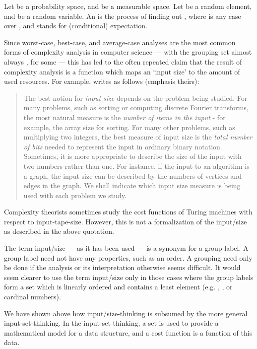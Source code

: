 \documentclass[b5paper, english, oneside]{memoir}
\begin{document}
\begin{definition}
Let  be a probability space, and  be a measurable space. Let  be a random element, and  be a random variable. An  is the process of finding out , where  is any case over , and  stands for (conditional) expectation.
\end{definition}

Since worst-case, best-case, and average-case analyses are the most common forms of complexity analysis in computer science --- with the grouping set almost always , for some  --- this has led to the often repeated claim that the result of complexity analysis is a function which maps an `input size' to the amount of used resources. For example, \cite[page 25]{IntroAlgo2009} writes as follows (emphasis theirs):
\begin{quotation}
\noindent
The best notion for \emph{input size} depends on the problem being studied. For many problems, such as sorting or computing discrete Fourier transforms, the most natural measure is the \emph{number of items in the input} - for example, the array size  for sorting. For many other problems, such as multiplying two integers, the best measure of input size is the \emph{total number of bits} needed to represent the input in ordinary binary notation. Sometimes, it is more appropriate to describe the size of the input with two numbers rather than one. For instance, if the input to an algorithm is a graph, the input size can be described by the numbers of vertices and edges in the graph. We shall indicate which input size measure is being used with each problem we study.
\end{quotation}

Complexity theorists sometimes study the cost functions of Turing machines with respect to input-tape-size. However, this is not a formalization of the input\-/size as described in the above quotation. 

The term input\-/size --- as it has been used --- is a synonym for a group label. A group label need not have any properties, such as an order. A grouping need only be done if the analysis or its interpretation otherwise seems difficult. It would seem clearer to use the term input\-/size only in those cases where the group labels form a set which is linearly ordered and contains a least element (e.g. , , or cardinal numbers).

We have shown above how input\-/size-thinking is subsumed by the more general input-set-thinking. In the input-set thinking, a set is used to provide a mathematical model for a data structure, and a cost function is a function of this data. 
\end{document}
